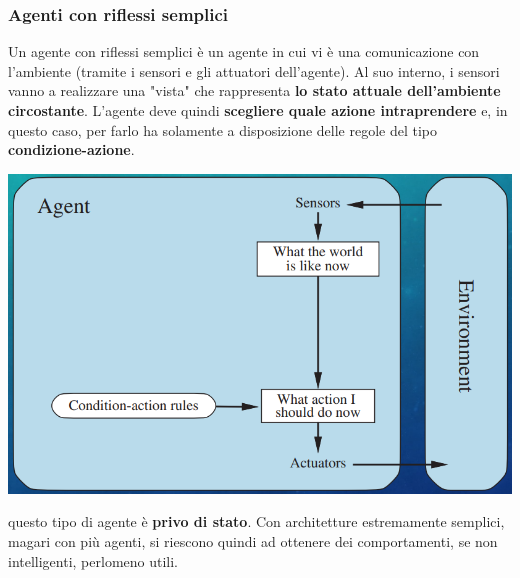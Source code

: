\documentclass[12pt]{article}
\begin{document}
\subsubsection{Agenti con riflessi semplici}
Un agente con riflessi semplici è un agente in cui vi è una comunicazione con l'ambiente (tramite i sensori e gli attuatori dell'agente).
Al suo interno, i sensori vanno a realizzare una "vista" che rappresenta \textbf{lo stato attuale dell'ambiente circostante}.
L'agente deve quindi \textbf{scegliere quale azione intraprendere} e, in questo caso, per farlo ha solamente a disposizione delle regole del tipo
\textbf{condizione-azione}.
\begin{center}
    \includegraphics[width = 0.70\linewidth]{Images/10.PNG}
\end{center}
questo tipo di agente è \textbf{privo di stato}. Con architetture estremamente semplici, magari con più agenti, si riescono
quindi ad ottenere dei comportamenti, se non intelligenti, perlomeno utili.
\end{document}
